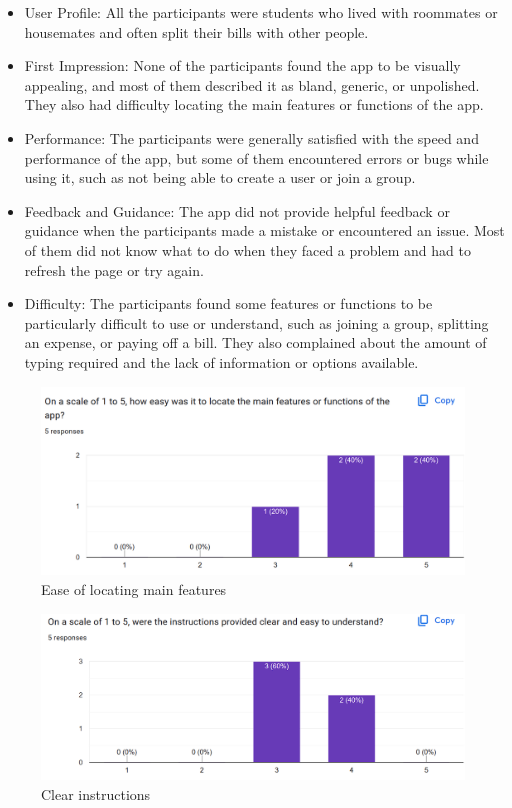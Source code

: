 \documentclass[12pt, titlepage]{article}
\begin{document}
\begin{itemize}
    \item User Profile: All the participants were students who lived with roommates or housemates and often split their bills with other people.
    \item First Impression: None of the participants found the app to be visually appealing, and most of them described it as bland, generic, or unpolished. They also had difficulty locating the main features or functions of the app.
    \item Performance: The participants were generally satisfied with the speed and performance of the app, but some of them encountered errors or bugs while using it, such as not being able to create a user or join a group.
    \item Feedback and Guidance: The app did not provide helpful feedback or guidance when the participants made a mistake or encountered an issue. Most of them did not know what to do when they faced a problem and had to refresh the page or try again.
    \item Difficulty: The participants found some features or functions to be particularly difficult to use or understand, such as joining a group, splitting an expense, or paying off a bill. They also complained about the amount of typing required and the lack of information or options available.
\end{itemize}

\begin{figure}[H]
    \centering
    \includegraphics[width=1\linewidth]{Usability_1.png}
    \caption{Ease of locating main features}
    \label{fig: Ease of locating main features}
\end{figure}

\begin{figure}[H]
    \centering
    \includegraphics[width=1\linewidth]{Usability_2.png}
    \caption{Clear instructions}
    \label{fig: Clear instructions}
\end{figure}
\end{document}
